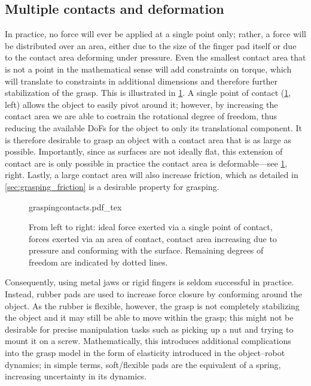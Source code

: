 \subsection{Multiple contacts and deformation}

In practice, no force will ever be applied at a single point only; rather, a force will be distributed over an area, either due to the size of the finger pad itself or due to the contact area deforming under pressure.
Even the smallest contact area that is not a point in the mathematical sense will add constraints on torque, which will translate to constraints in additional dimensions and therefore further stabilization of the grasp. This is illustrated in \cref{fig:contactarea}.
A single point of contact (\cref{fig:contactarea}, left) allows the object to easily pivot around it; however, by increasing the contact area we are able to costrain the rotational degree of freedom, thus reducing the available DoFs for the object to only its translational component.
It is therefore desirable to grasp an object with a contact area that is as large as possible. Importantly, since as surfaces are not ideally flat, this extension of contact are is only possible in practice the contact area is deformable---see \cref{fig:contactarea}, right. Lastly, a large contact area will also increase friction, which as detailed in \cref{sec:grasping_friction} is a desirable property for grasping.

\begin{figure}
    \def\svgwidth{\textwidth}
    {graspingcontacts.pdf_tex}
    \caption{From left to right: ideal force exerted via a single point of contact, forces exerted via an area of contact, contact area increasing due to pressure and conforming with the surface. Remaining degrees of freedom are indicated by dotted lines.  \label{fig:contactarea}}
\end{figure}

Consequently, using metal jaws or rigid fingers is seldom successful in practice. Instead, rubber pads are used to increase force closure by conforming around the object. As the rubber is flexible, however, the grasp is not completely stabilizing the object and it may still be able to move within the grasp; this might not be desirable for precise manipulation tasks such as picking up a nut and trying to mount it on a screw. Mathematically, this introduces additional complications into the grasp model in the form of elasticity introduced in the object--robot dynamics; in simple terms, soft/flexible pads are the equivalent of a spring, increasing uncertainty in its dynamics.

